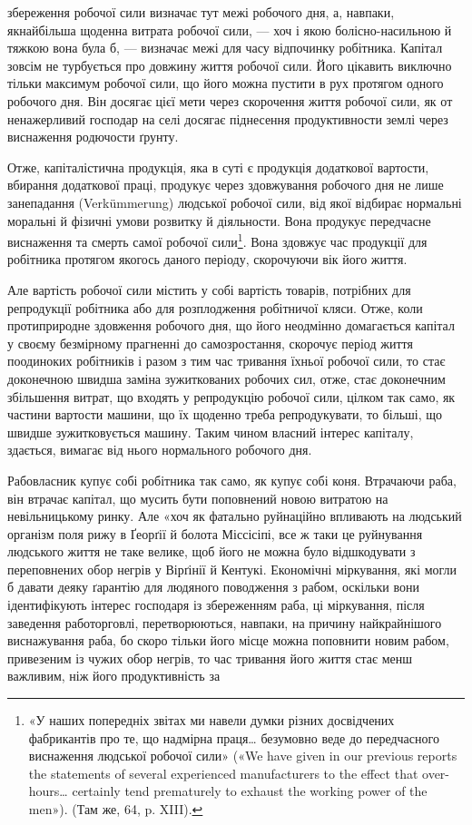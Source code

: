 \parcont{}  %
збереження робочої сили визначає тут межі робочого дня, а,
навпаки, якнайбільша щоденна витрата робочої сили, — хоч і
якою болісно-насильною й тяжкою вона була б, — визначає
межі для часу відпочинку робітника. Капітал зовсім не турбується
про довжину життя робочої сили. Його цікавить виключно тільки
максимум робочої сили, що його можна пустити в рух протягом
одного робочого дня. Він досягає цієї мети через скорочення життя
робочої сили, як от ненажерливий господар на селі досягає піднесення
продуктивности землі через виснаження родючости ґрунту.

Отже, капіталістична продукція, яка в суті є продукція додаткової
вартости, вбирання додаткової праці, продукує через
здовжування робочого дня не лише занепадання (Verkümmerung)
людської робочої сили, від якої відбирає нормальні моральні й
фізичні умови розвитку й діяльности. Вона продукує передчасне
виснаження та смерть самої робочої сили\footnote{
«У наших попередніх звітах ми навели думки різних досвідчених
фабрикантів про те, що надмірна праця\dots{} безумовно веде до передчасного
виснаження людської робочої сили» («We have given in our previous
reports the statements of several experienced manufacturers to the effect
that over-hours\dots{} certainly tend prematurely to exhaust the working
power of the men»). (Там же, 64, p. XIII).
}. Вона здовжує
час продукції для робітника протягом якогось даного періоду,
скорочуючи вік його життя.

Але вартість робочої сили містить у собі вартість товарів,
потрібних для репродукції робітника або для розплодження
робітничої кляси. Отже, коли протиприродне здовження робочого
дня, що його неодмінно домагається капітал у своєму безмірному
прагненні до самозростання, скорочує період життя поодиноких
робітників і разом з тим час тривання їхньої робочої сили, то
стає доконечною швидша заміна зужиткованих робочих сил, отже,
стає доконечним збільшення витрат, що входять у репродукцію
робочої сили, цілком так само, як частини вартости машини, що
їх щоденно треба репродукувати, то більші, що швидше зужитковується
машину. Таким чином власний інтерес капіталу, здається,
вимагає від нього нормального робочого дня.

Рабовласник купує собі робітника так само, як купує собі
коня. Втрачаючи раба, він втрачає капітал, що мусить бути поповнений
новою витратою на невільницькому ринку. Але «хоч
як фатально руйнаційно впливають на людський організм поля
рижу в Ґеорґії й болота Міссісіпі, все ж таки це руйнування людського
життя не таке велике, щоб його не можна було відшкодувати
з переповнених обор негрів у Вірґінії й Кентукі. Економічні
міркування, які могли б давати деяку ґарантію для людяного
поводження з рабом, оскільки вони ідентифікують інтерес господаря
із збереженням раба, ці міркування, після заведення работорговлі,
перетворюються, навпаки, на причину найкрайнішого
виснажування раба, бо скоро тільки його місце можна поповнити
новим рабом, привезеним із чужих обор негрів, то час тривання
його життя стає менш важливим, ніж його продуктивність за
\parbreak{}  %
